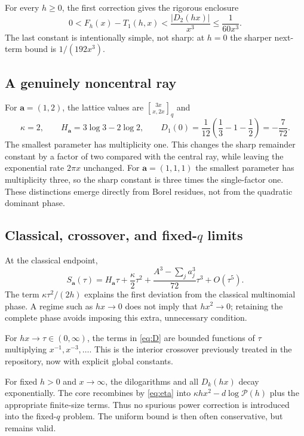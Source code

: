\documentclass[11pt,a4paper]{article}
\numberwithin{equation}{section}
\theoremstyle{definition}\newtheorem{definition}[theorem]{Definition}
\theoremstyle{remark}\newtheorem{remark}[theorem]{Remark}
\newcommand{\avec}{\boldsymbol a}
\newcommand{\calP}{\mathcal P}
\newcommand{\qmulti}[2]{\genfrac{[}{]}{0pt}{}{#1}{#2}_{q}}
\begin{document}
For every $h\ge0$, the first correction gives the rigorous enclosure
\begin{equation}
 0<F_h(x)-T_1(h,x)
   <\frac{|D_2(hx)|}{x^3}\le\frac1{60x^3}.
 \label{eq:first-simple-bound}
\end{equation}
The last constant is intentionally simple, not sharp: at $h=0$ the sharper
next-term bound is $1/(192x^3)$.

\subsection{A genuinely noncentral ray}
For $\avec=(1,2)$, the lattice values are $\qmulti{3x}{x,2x}$ and
\begin{equation}
 \kappa=2,\qquad H_{\avec}=3\log3-2\log2,\qquad
 D_1(0)=\frac1{12}\left(\frac13-1-\frac12\right)=-\frac7{72}.
\end{equation}
The smallest parameter has multiplicity one. This changes the sharp remainder
constant by a factor of two compared with the central ray, while leaving the
exponential rate $2\pi x$ unchanged. For $\avec=(1,1,1)$ the smallest parameter
has multiplicity three, so the sharp constant is three times the single-factor
one. These distinctions emerge directly from Borel residues, not from the
quadratic dominant phase.

\subsection{Classical, crossover, and fixed-\texorpdfstring{$q$}{q} limits}
At the classical endpoint,
\begin{equation}
 S_{\avec}(\tau)=H_{\avec}\tau+\frac\kappa2\tau^2
        +\frac{A^3-\sum_j a_j^3}{72}\tau^3+O(\tau^5).
 \label{eq:Ssmall}
\end{equation}
The term $\kappa\tau^2/(2h)$ explains the first deviation from the classical
multinomial phase. A regime such as $hx\to0$ does not imply that $hx^2\to0$;
retaining the complete phase avoids imposing this extra, unnecessary condition.

For $hx\to\tau\in(0,\infty)$, the terms in \eqref{eq:D} are bounded functions
of $\tau$ multiplying $x^{-1},x^{-3},\ldots$. This is the interior crossover
previously treated in the repository, now with explicit global constants.

For fixed $h>0$ and $x\to\infty$, the dilogarithms and all $D_k(hx)$ decay
exponentially. The core recombines by \eqref{eq:eta} into
$\kappa hx^2-d\log\calP(h)$ plus the appropriate finite-size terms. Thus no
spurious power correction is introduced into the fixed-$q$ problem. The
uniform bound is then often conservative, but remains valid.
\end{document}
